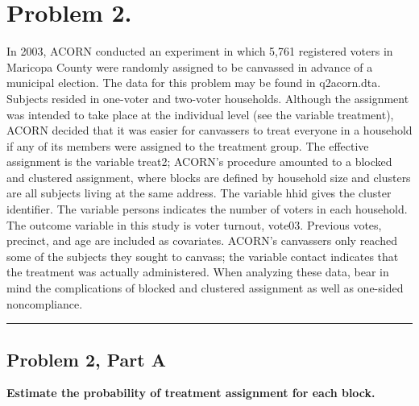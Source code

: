 \documentclass[11pt,notitlepage]{article}
\begin{document}
\clearpage
\section{Problem 2.}  In 2003, ACORN conducted an experiment in which 5,761 registered voters in Maricopa County were randomly assigned to be canvassed in advance of a municipal election.  The data for this problem may be found in q2acorn.dta. Subjects resided in one-voter and two-voter households.  Although the assignment was intended to take place at the individual level (see the variable treatment), ACORN decided that it was easier for canvassers to treat everyone in a household if any of its members were assigned to the treatment group.  The effective assignment is the variable treat2; ACORN's procedure amounted to a blocked and clustered assignment, where blocks are defined by household size and clusters are all subjects living at the same address.  The variable hhid gives the cluster identifier.  The variable persons indicates the number of voters in each household.  The outcome variable in this study is voter turnout, vote03.  Previous votes, precinct, and age are included as covariates. ACORN's canvassers only reached some of the subjects they sought to canvass; the variable contact indicates that the treatment was actually administered.  When analyzing these data, bear in mind the complications of blocked and clustered assignment as well as one-sided noncompliance.


\vspace{.5cm}
\hrule
\vspace{.5cm}

\subsection{Problem 2, Part A} {\bf Estimate the probability of treatment assignment for each block.}

\vspace{1cm}
\end{document}
